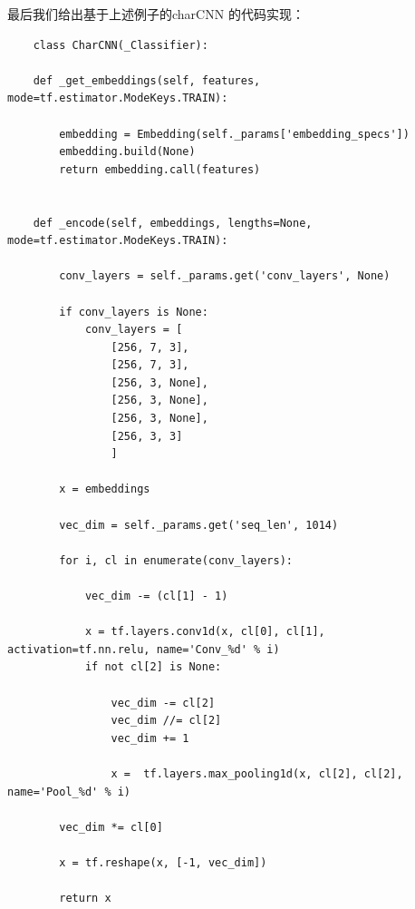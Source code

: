 \documentclass[twoside,a4paper,12pt]{book}%
\begin{document}
\begin{table}[h]
	\caption{charCNN的卷积网络结构}  
	\label{tab:schedule}
	\centering
\end{table}

最后我们给出基于上述例子的char\gls{CNN} 的代码实现：

\begin{lstlisting}
	class CharCNN(_Classifier):

    def _get_embeddings(self, features, mode=tf.estimator.ModeKeys.TRAIN):
        
        embedding = Embedding(self._params['embedding_specs'])
        embedding.build(None)
        return embedding.call(features)          
            
        
    def _encode(self, embeddings, lengths=None, mode=tf.estimator.ModeKeys.TRAIN):

        conv_layers = self._params.get('conv_layers', None)
        
        if conv_layers is None:
            conv_layers = [
                [256, 7, 3],
                [256, 7, 3],
                [256, 3, None],
                [256, 3, None],
                [256, 3, None],
                [256, 3, 3]
                ]

        x = embeddings

        vec_dim = self._params.get('seq_len', 1014)

        for i, cl in enumerate(conv_layers):
            
            vec_dim -= (cl[1] - 1)

            x = tf.layers.conv1d(x, cl[0], cl[1], activation=tf.nn.relu, name='Conv_%d' % i)
            if not cl[2] is None:
                
                vec_dim -= cl[2]
                vec_dim //= cl[2]
                vec_dim += 1
                
                x =  tf.layers.max_pooling1d(x, cl[2], cl[2], name='Pool_%d' % i)
        
        vec_dim *= cl[0]
        
        x = tf.reshape(x, [-1, vec_dim])

        return x
\end{lstlisting}
\end{document}

